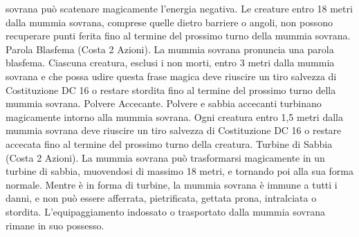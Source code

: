 \begin{multicols}{2}
sovrana può scatenare magicamente l’energia negativa. Le
creature entro 18 metri dalla mummia sovrana, comprese quelle
dietro barriere o angoli, non possono recuperare punti ferita fino
al termine del prossimo turno della mummia sovrana.
Parola Blasfema (Costa 2 Azioni). La mummia sovrana
pronuncia una parola blasfema. Ciascuna creatura, esclusi i non
morti, entro 3 metri dalla mummia sovrana e che possa udire
questa frase magica deve riuscire un tiro salvezza di Costituzione
DC 16 o restare stordita fino al termine del prossimo turno della
mummia sovrana.
Polvere Accecante. Polvere e sabbia accecanti turbinano
magicamente intorno alla mummia sovrana. Ogni creatura entro
1,5 metri dalla mummia sovrana deve riuscire un tiro salvezza di
Costituzione DC 16 o restare accecata fino al termine del
prossimo turno della creatura.
Turbine di Sabbia (Costa 2 Azioni). La mummia sovrana può
trasformarsi magicamente in un turbine di sabbia, muovendosi di
massimo 18 metri, e tornando poi alla sua forma normale.
Mentre è in forma di turbine, la mummia sovrana è immune a
tutti i danni, e non può essere afferrata, pietrificata, gettata prona,
intralciata o stordita. L’equipaggiamento indossato o trasportato
dalla mummia sovrana rimane in suo possesso.
 

\end{multicols}
